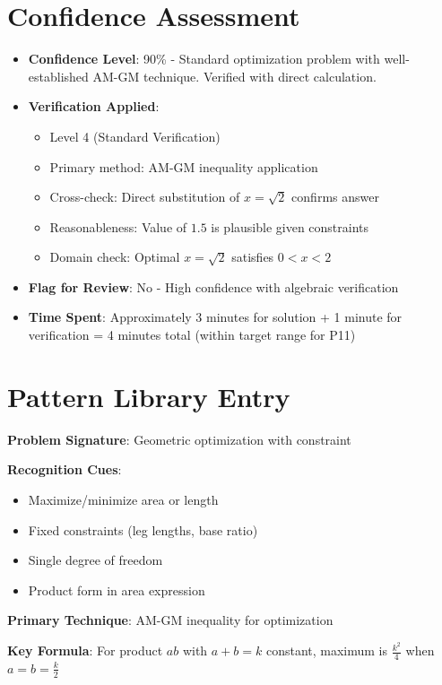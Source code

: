\documentclass[12pt]{article}
\begin{document}
\section*{Confidence Assessment}
\begin{itemize}[leftmargin=*]
    \item \textbf{Confidence Level}: 90\% - Standard optimization problem with well-established AM-GM technique. Verified with direct calculation.
    \item \textbf{Verification Applied}: 
    \begin{itemize}
        \item Level 4 (Standard Verification)
        \item Primary method: AM-GM inequality application
        \item Cross-check: Direct substitution of $x = \sqrt{2}$ confirms answer
        \item Reasonableness: Value of $1.5$ is plausible given constraints
        \item Domain check: Optimal $x = \sqrt{2}$ satisfies $0 < x < 2$
    \end{itemize}
    \item \textbf{Flag for Review}: No - High confidence with algebraic verification
    \item \textbf{Time Spent}: Approximately 3 minutes for solution + 1 minute for verification = 4 minutes total (within target range for P11)
\end{itemize}

\section*{Pattern Library Entry}

\textbf{Problem Signature}: Geometric optimization with constraint

\textbf{Recognition Cues}: 
\begin{itemize}
    \item Maximize/minimize area or length
    \item Fixed constraints (leg lengths, base ratio)
    \item Single degree of freedom
    \item Product form in area expression
\end{itemize}

\textbf{Primary Technique}: AM-GM inequality for optimization

\textbf{Key Formula}: For product $ab$ with $a+b = k$ constant, maximum is $\frac{k^2}{4}$ when $a = b = \frac{k}{2}$
\end{document}
